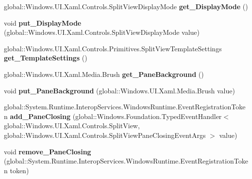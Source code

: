 \begin{DoxyCompactItemize}
global\+::\+Windows.\+U\+I.\+Xaml.\+Controls.\+Split\+View\+Display\+Mode {\bfseries get\+\_\+\+Display\+Mode} ()
\item 
\mbox{\label{interface_windows_1_1_u_i_1_1_xaml_1_1_controls_1_1_i_split_view_a31d4c4574b734f77622f95bc78b04c1a}} 
void {\bfseries put\+\_\+\+Display\+Mode} (global\+::\+Windows.\+U\+I.\+Xaml.\+Controls.\+Split\+View\+Display\+Mode value)
\item 
\mbox{\label{interface_windows_1_1_u_i_1_1_xaml_1_1_controls_1_1_i_split_view_a5d410ee30d731de0a395a350b650dabb}} 
global\+::\+Windows.\+U\+I.\+Xaml.\+Controls.\+Primitives.\+Split\+View\+Template\+Settings {\bfseries get\+\_\+\+Template\+Settings} ()
\item 
\mbox{\label{interface_windows_1_1_u_i_1_1_xaml_1_1_controls_1_1_i_split_view_a1c78e9b7f929fa0f024bfd75bd93b2b3}} 
global\+::\+Windows.\+U\+I.\+Xaml.\+Media.\+Brush {\bfseries get\+\_\+\+Pane\+Background} ()
\item 
\mbox{\label{interface_windows_1_1_u_i_1_1_xaml_1_1_controls_1_1_i_split_view_a097467d9287cc5b1864024d0d471fe18}} 
void {\bfseries put\+\_\+\+Pane\+Background} (global\+::\+Windows.\+U\+I.\+Xaml.\+Media.\+Brush value)
\item 
\mbox{\label{interface_windows_1_1_u_i_1_1_xaml_1_1_controls_1_1_i_split_view_a69ee46b94201df4d3b787eb9e974289a}} 
global\+::\+System.\+Runtime.\+Interop\+Services.\+Windows\+Runtime.\+Event\+Registration\+Token {\bfseries add\+\_\+\+Pane\+Closing} (global\+::\+Windows.\+Foundation.\+Typed\+Event\+Handler$<$ global\+::\+Windows.\+U\+I.\+Xaml.\+Controls.\+Split\+View, global\+::\+Windows.\+U\+I.\+Xaml.\+Controls.\+Split\+View\+Pane\+Closing\+Event\+Args $>$ value)
\item 
\mbox{\label{interface_windows_1_1_u_i_1_1_xaml_1_1_controls_1_1_i_split_view_a6264ad76174d999d605b9e7745a813f6}} 
void {\bfseries remove\+\_\+\+Pane\+Closing} (global\+::\+System.\+Runtime.\+Interop\+Services.\+Windows\+Runtime.\+Event\+Registration\+Token token)

\end{DoxyCompactItemize}
